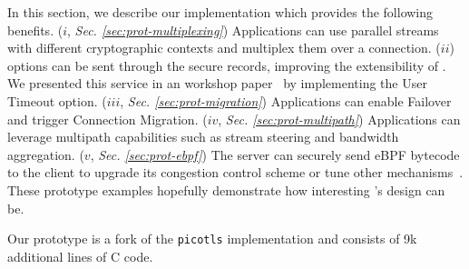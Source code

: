 \label{sec:content}

In this section, we describe our \tcpls implementation which provides the 
following benefits.
($i$, \textit{Sec. \ref{sec:prot-multiplexing}}) Applications can use parallel 
streams with 
different cryptographic 
contexts and multiplex them over a \tcp connection.
($ii$) \tcp options can be sent through the secure \tcpls records, improving 
the extensibility of \tcp. We presented this service in an workshop
paper~\cite{rochet2020tcpls} by implementing the \tcp User Timeout option.
($iii$, \textit{Sec. \ref{sec:prot-migration}}) Applications can enable 
Failover and 
trigger Connection Migration.
($iv$, \textit{Sec. \ref{sec:prot-multipath}}) Applications can leverage 
multipath 
capabilities such as stream 
steering %
and bandwidth aggregation.
($v$, \textit{Sec. \ref{sec:prot-ebpf}}) The server can securely send eBPF 
bytecode to the client 
to upgrade its \tcp congestion control scheme or tune other \tcp 
mechanisms~\cite{brakmo2017tcp,tran2019beyond}. These prototype examples
hopefully demonstrate how interesting \tcpls's design can be.

Our \tcpls prototype is a fork of the \texttt{picotls}  implementation 
and consists of 9k additional lines of C code.

